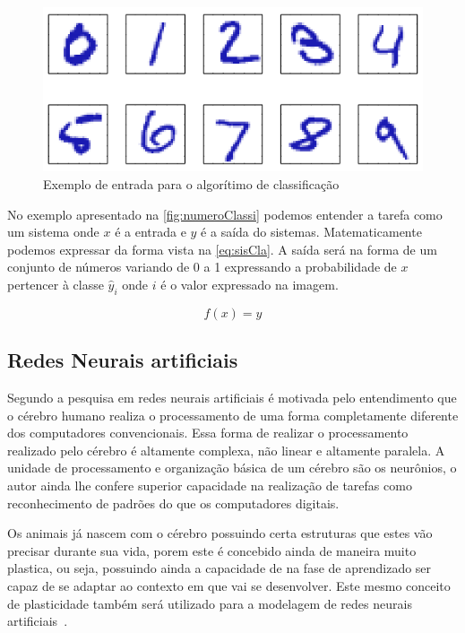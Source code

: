 \documentclass[
    12pt,
    oneside,
    a4paper,
    english,
    brazil
]{abntex2}
\begin{document}
\begin{figure}
    \centering
    \caption{Exemplo de entrada para o algorítimo de
        classificação}\label{fig:numeroClassi}
    \includegraphics[width=.5\linewidth]{images/numeroClassificacao.png}
\end{figure}

No exemplo apresentado na  \autoref{fig:numeroClassi} podemos entender a tarefa
como  um sistema  onde $x$  é a  entrada  e $\hat{y}$  é a  saída do  sistemas.
Matematicamente  podemos expressar  da  forma vista  na \autoref{eq:sisCla}.  A
saída será na forma  de um conjunto de números variando de 0  a 1 expressando a
probabilidade  de  $x$ pertencer  à  classe  $\hat{y}_i$  onde  $i$ é  o  valor
expressado na imagem.

\begin{equation}
    \label{eq:sisCla}
    f(x) = \hat{y}
\end{equation}

\subsection{Redes Neurais artificiais}

Segundo    a pesquisa  em  redes  neurais artificiais  é
motivada pelo entendimento que o cérebro  humano realiza o processamento de uma
forma  completamente diferente  dos computadores  convencionais. Essa  forma de
realizar  o processamento  realizado  pelo cérebro  é  altamente complexa,  não
linear e altamente paralela. A unidade de processamento e organização básica de
um cérebro são  os neurônios, o autor ainda lhe  confere superior capacidade na
realização de  tarefas como  reconhecimento de padrões  do que  os computadores
digitais.

Os animais  já nascem com  o cérebro possuindo  certa estruturas que  estes vão
precisar  durante sua  vida,  porem este  é concebido  ainda  de maneira  muito
plastica, ou seja,  possuindo ainda a capacidade de na  fase de aprendizado ser
capaz de se adaptar ao contexto em  que vai se desenvolver. Este mesmo conceito
de  plasticidade  também será  utilizado  para  a  modelagem de  redes  neurais
artificiais~\cite{haykin2009}.
\end{document}

